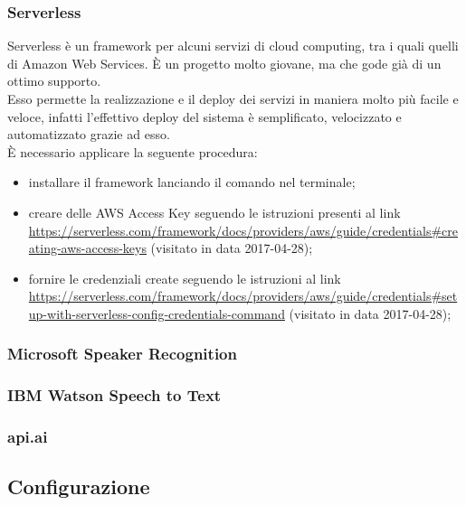 \subsubsection{Serverless}
Serverless è un framework per alcuni servizi di cloud computing, tra i quali quelli di Amazon Web Services. È un progetto molto giovane, ma che gode già di un ottimo supporto.\\
Esso permette la realizzazione e il deploy dei servizi in maniera molto più facile e veloce, infatti l'effettivo deploy del sistema è semplificato, velocizzato e automatizzato grazie ad esso. \\
È necessario applicare la seguente procedura:
\begin{itemize}
	\item installare il framework lanciando il comando  nel terminale;
	\item creare delle AWS Access Key seguendo le istruzioni presenti al link \url{https://serverless.com/framework/docs/providers/aws/guide/credentials#creating-aws-access-keys} (visitato in data 2017-04-28);
	\item fornire le credenziali create seguendo le istruzioni al link \url{https://serverless.com/framework/docs/providers/aws/guide/credentials#setup-with-serverless-config-credentials-command} (visitato in data 2017-04-28);
\end{itemize}
\subsubsection{Microsoft Speaker Recognition}
\subsubsection{IBM Watson Speech to Text}
\subsubsection{api.ai}
\subsection{Configurazione}